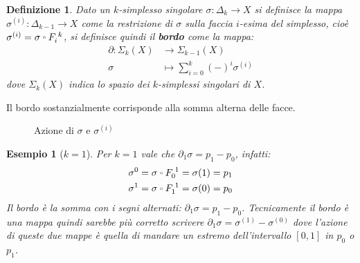 \documentclass[10pt, twoside=false, x11names]{scrbook}
\newtheorem{definition}[theorem]{Definizione}
\newtheorem{example}[theorem]{Esempio}
\let\latexcirc=\circ
\newcommand{\ccirc}{\mathbin{\mathchoice
  {\xcirc\scriptstyle}
  {\xcirc\scriptstyle}
  {\xcirc\scriptscriptstyle}
  {\xcirc\scriptscriptstyle}
}}
\newcommand{\xcirc}[1]{\vcenter{\hbox{$#1\latexcirc$}}}
\let\circ\ccirc
\begin{document}
\begin{definition}
  Dato un $ k $-simplesso singolare $ \sigma: \Delta_k \to X $ si definisce la mappa $ \sigma^{(i)} \colon \Delta_{k-1} \to X $ come la restrizione
  di $ \sigma $ sulla faccia $ i $-esima del simplesso, cioè $ \sigma^{(i)} = \sigma \circ F_i^{\; k} $,
  si definisce quindi il \textbf{bordo} come la mappa:
  \begin{align*}
    \partial \colon \Sigma_k(X) & \to \Sigma_{k-1}(X) \\
    \sigma & \mapsto  \sum_{i=0}^{k}(-)^i \sigma^{(i)}
  \end{align*}
  dove $ \Sigma_k(X) $ indica lo spazio dei $ k $-simplessi singolari di $ X $.
\end{definition}
Il bordo sostanzialmente corrisponde alla somma alterna delle facce.

\begin{figure}[htbp]
  \centering
  \caption{Azione di $ \sigma $ e $ \sigma^{(i)} $}
  \label{fig:lez1:sigma}
\end{figure}

\begin{example}[$ k = 1 $]
  Per $ k = 1 $ vale che $ \partial_1 \sigma = p_1 - p_0 $, infatti:
  \begin{align*}
    \sigma^{0} = \sigma \circ F_0^{\; 1} = \sigma(1) = p_1 \\
    \sigma^{1} = \sigma \circ F_1^{\; 1} = \sigma(0) = p_0
  \end{align*}
  Il bordo è la somma con i segni alternati: $ \partial_1 \sigma = p_1 - p_0 $. Tecnicamente il bordo è una mappa
  quindi sarebbe più corretto scrivere $ \partial_1 \sigma = \sigma^{(1)} - \sigma^{(0)} $ dove l'azione di queste due mappe è
  quella di mandare un estremo dell'intervallo $ [0,1] $ in $ p_0 $ o $ p_1 $.
\end{example}
\end{document}
